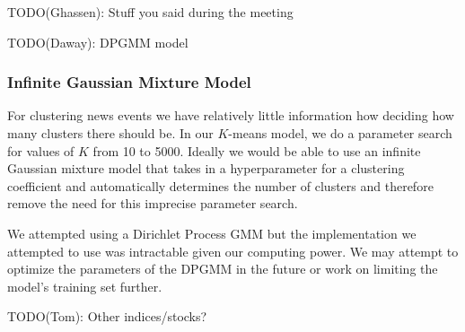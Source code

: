 
TODO(Ghassen): Stuff you said during the meeting

TODO(Daway): DPGMM model
\subsubsection{Infinite Gaussian Mixture Model}
For clustering news events we have relatively little information how deciding how many clusters there should be. In our $K$-means model, we do a parameter search for values of $K$ from 10 to 5000. Ideally we would be able to use an infinite Gaussian mixture model that takes in a hyperparameter for a clustering coefficient and automatically determines the number of clusters and therefore remove the need for this imprecise parameter search. 

We attempted using a Dirichlet Process GMM but the implementation we attempted to use was intractable given our computing power. We may attempt to optimize the parameters of the DPGMM in the future or work on limiting the model's training set further. 


TODO(Tom): Other indices/stocks?


